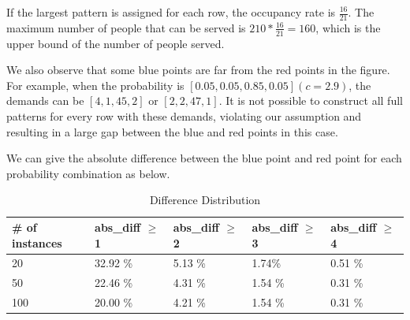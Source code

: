 If the largest pattern is assigned for each row, the occupancy rate is $\frac{16}{21}$. The maximum number of people that can be served is $210 * \frac{16}{21} = 160$, which is the upper bound of the number of people served.

We also observe that some blue points are far from the red points in the figure. For example, when the probability is $[0.05, 0.05, 0.85, 0.05] (c = 2.9)$, the demands can be $[4, 1, 45, 2]$ or $[2, 2, 47, 1]$. It is not possible to construct all full patterns for every row with these demands, violating our assumption and resulting in a large gap between the blue and red points in this case.






We can give the absolute difference between the blue point and red point for each probability combination as below.

\begin{table}[ht]
  \centering
  \caption{Difference Distribution}
  \begin{tabular}{|l|l|l|l|l|}
  \hline
  \# of instances & abs\_diff $\geq$ 1 & abs\_diff $\geq$ 2 & abs\_diff $\geq$ 3 & abs\_diff $\geq$ 4 \\
  \hline
  20 & 32.92 \% & 5.13 \% & 1.74\% & 0.51 \% \\
  50 & 22.46 \% & 4.31 \% & 1.54 \% & 0.31 \%  \\
  100 & 20.00 \% & 4.21 \% & 1.54 \% & 0.31 \% \\
  \hline
  \end{tabular}
\end{table}


